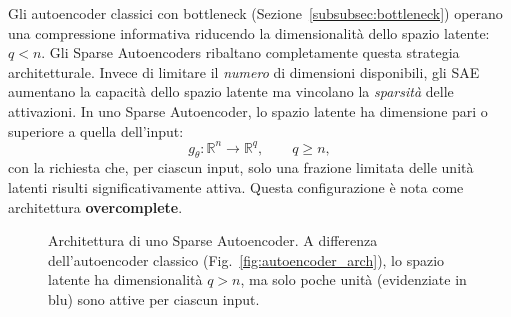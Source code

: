 Gli autoencoder classici con bottleneck (Sezione~\ref{subsubsec:bottleneck}) operano una compressione informativa riducendo la dimensionalità dello spazio latente: $q < n$. Gli Sparse Autoencoders ribaltano completamente questa strategia architetturale.
Invece di limitare il \textit{numero} di dimensioni disponibili, gli SAE aumentano la capacità dello spazio latente ma vincolano la \textit{sparsità} delle attivazioni. In uno Sparse Autoencoder, lo spazio latente ha dimensione pari o superiore a quella dell'input:
\begin{equation}
    g_\theta : \mathbb{R}^n \rightarrow \mathbb{R}^q, \qquad q \geq n,
    \label{eq:sae_overcomplete}
\end{equation}
con la richiesta che, per ciascun input, solo una frazione limitata delle unità latenti risulti significativamente attiva. Questa configurazione è nota come architettura \textbf{overcomplete}.
\begin{figure}[h!]
    \centering
    \caption{Architettura di uno Sparse Autoencoder. A differenza dell'autoencoder classico (Fig.~\ref{fig:autoencoder_arch}), lo spazio latente ha dimensionalità $q > n$, ma solo poche unità (evidenziate in blu) sono attive per ciascun input.}
    \label{fig:sparse_autoencoder_arch}
\end{figure}

